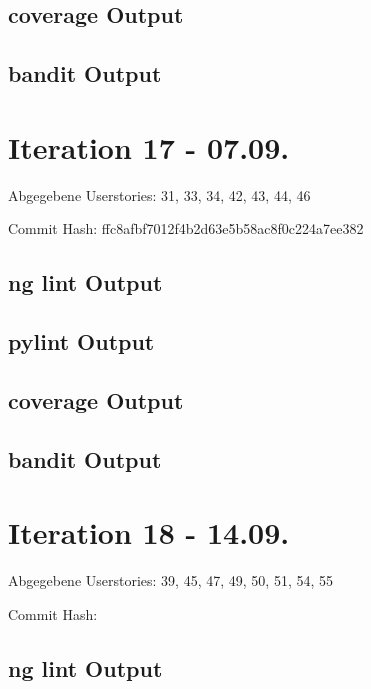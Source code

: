 \documentclass[accentcolor=tud0b,12pt,paper=a4]{tudreport}
\begin{document}
	\subsection*{coverage Output}
	
	
	\subsection*{bandit Output}
	

\section*{Iteration 17 - 07.09.}
	Abgegebene Userstories: 31, 33, 34, 42, 43, 44, 46
	
	Commit Hash: ffc8afbf7012f4b2d63e5b58ac8f0c224a7ee382
	
	\subsection*{ng lint Output}
	
	
	\subsection*{pylint Output}
	
	
	\subsection*{coverage Output}
	
	
	\subsection*{bandit Output}
	

\section*{Iteration 18 - 14.09.}
	Abgegebene Userstories: 39, 45, 47, 49, 50, 51, 54, 55
	
	Commit Hash: 
	
	\subsection*{ng lint Output}
	
	
\end{document}

